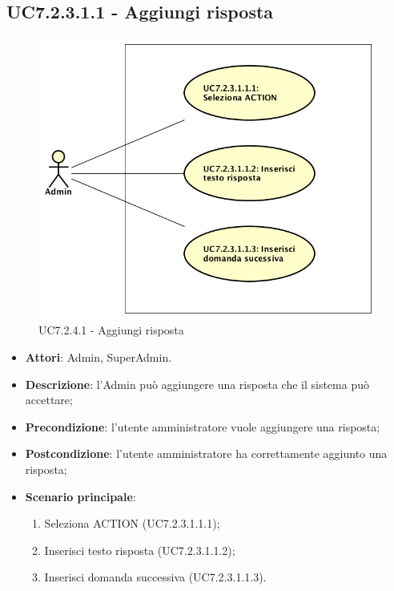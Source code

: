 \documentclass[../AnalisiDeiRequisiti_v3.0.0.tex]{subfiles}
\begin{document}
\subsection{UC7.2.3.1.1 - Aggiungi risposta} 
\label{sssec:UC7.2.3.1.1} 
\begin{figure}[!h]
	\centering
	\includegraphics[scale=0.7]{UseCases/UC7_GestionePannelloAdmin/UC7_2_GestioneDomande/UC7_2_3_ModificaDomanda/UC7_2_3_1_GestioneRisposte/UC7_2_3_1_1_AggiungiRisposta/UC7_2_3_1_1_AggiungiRisposta.png}
	\caption{UC7.2.4.1 - Aggiungi risposta}
\end{figure}
\begin{itemize} 
\item \textbf{Attori}: Admin, SuperAdmin.
\item \textbf{Descrizione}: l'Admin può aggiungere una risposta che il sistema può accettare;
\item \textbf{Precondizione}: l'utente amministratore vuole aggiungere una risposta;
\item \textbf{Postcondizione}: l'utente amministratore ha correttamente aggiunto una risposta;
\item \textbf{Scenario principale}: \begin{enumerate}\item Seleziona ACTION (UC7.2.3.1.1.1);\item Inserisci testo risposta (UC7.2.3.1.1.2);\item Inserisci domanda successiva (UC7.2.3.1.1.3).
\end{enumerate}
\end{itemize}  
\end{document}
